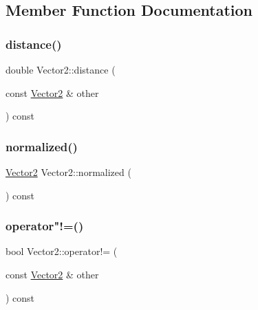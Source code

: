 \subsection{Member Function Documentation}
\mbox{\label{struct_vector2_a75a29091c7c6f2f38e987ed2c62283c8}} 
\subsubsection{\texorpdfstring{distance()}{distance()}}
{\footnotesize\ttfamily double Vector2\+::distance (\begin{DoxyParamCaption}\item[{const \mbox{\hyperlink{struct_vector2}{Vector2}} \&}]{other }\end{DoxyParamCaption}) const}

\mbox{\label{struct_vector2_a1e0be0f2d578e8b5d0b8f95a9f8b6626}} 
\subsubsection{\texorpdfstring{normalized()}{normalized()}}
{\footnotesize\ttfamily \mbox{\hyperlink{struct_vector2}{Vector2}} Vector2\+::normalized (\begin{DoxyParamCaption}{ }\end{DoxyParamCaption}) const}

\mbox{\label{struct_vector2_af3b049c981a79bd60495b6362aa6392b}} 
\subsubsection{\texorpdfstring{operator"!=()}{operator!=()}}
{\footnotesize\ttfamily bool Vector2\+::operator!= (\begin{DoxyParamCaption}\item[{const \mbox{\hyperlink{struct_vector2}{Vector2}} \&}]{other }\end{DoxyParamCaption}) const}

\mbox{\label{struct_vector2_a53bdaa4ea8e1504f8a78ac78e6f151bf}} 

